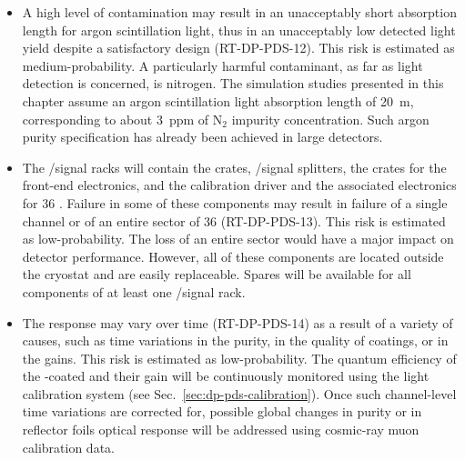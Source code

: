 \begin{itemize}

\item A high level of  contamination may result in an unacceptably short absorption length for argon scintillation light, thus in an unacceptably low detected light yield despite a satisfactory  design (RT-DP-PDS-12). This risk is estimated as medium-probability. A particularly harmful contaminant, as far as light detection is concerned, is nitrogen. The simulation studies presented in this chapter assume an argon scintillation light absorption length of \SI{20}{m}, corresponding to about \SI{3}{ppm} of N$_2$ impurity concentration. Such argon purity specification has already been achieved in large  detectors.

\item The /signal racks will contain the  crates, /signal splitters, the  crates for the front-end electronics, and the calibration  driver and the associated electronics for \num{36} . Failure in some of these components may result in failure of a single  channel or of an entire sector of \num{36}  (RT-DP-PDS-13). This risk is estimated as low-probability. The loss of an entire  sector would have a major impact on detector performance. However, all of these components are located outside the cryostat and are easily replaceable. Spares will be available for all components of at least one /signal rack.

\item The  response may vary over time (RT-DP-PDS-14) as a result of a variety of causes, such as time variations in the  purity, in the quality of  coatings, or in the  gains. This risk is estimated as low-probability. The quantum efficiency of the -coated  and their gain will be continuously monitored using the light calibration system (see Sec.~\ref{sec:dp-pds-calibration}). Once such channel-level time variations are corrected for, possible global changes in  purity or in  reflector foils optical response will be addressed using cosmic-ray muon calibration data. 

\end{itemize}
